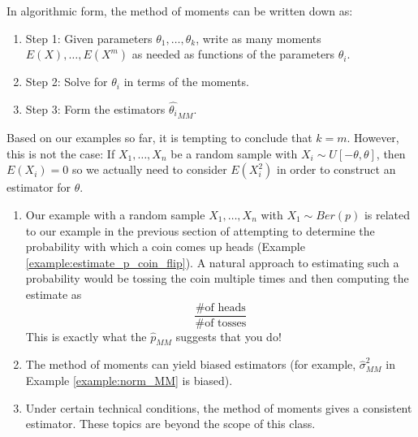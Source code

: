 In algorithmic form, the method of moments can be written down as:

\begin{enumerate}
\item Step 1: Given parameters $\theta_1, \ldots, \theta_k$, write as many moments $E(X), \ldots, E(X^m)$ as needed as functions of the parameters $\theta_i$.

\iffalse	\begin{center}
	\begin{tabular}{ c c c }
	 $E(X)$ & = & $h_1(\theta_1, \ldots, \theta_k)$\\ 
	 $E(X^2)$ & =& $h_2(\theta_1, \ldots, \theta_k)$\\  
	 $\vdots$ & & \\
	 $E(X^k)$ & = & $h_k(\theta_1, \ldots, \theta_k)$
	\end{tabular}
	\end{center} \fi

\item Step 2: Solve for $\theta_i$ in terms of the moments. \iffalse
	\begin{center}
	\begin{tabular}{ c c c }
	 $\theta_1$ & = & $\ell_1(E(X_1), \ldots, E(X^k))$\\
	 $\vdots$ & & \\
	 $\theta_k$ & = & $\ell_k(E(X), \ldots, E(X^k))$
	\end{tabular}
	\end{center} \fi

\item Step 3: Form the estimators $\hat{{\theta_i}}_{MM}$. \iffalse
	\[
		\hat{\theta_i}_{MM} = \ell_i\left(
			\frac{1}{n} \sum_{j=1}^n X_j,
			\frac{1}{n} \sum_{j=1}^n X_j^2,
			\ldots,
			\frac{1}{n} \sum_{j=1}^n X_j^k
		\right)
	\] \fi
\end{enumerate}

Based on our examples so far, it is tempting to conclude that $k=m$. However, this is not the case: If $X_1, \ldots, X_n$ be a random sample with $X_i \sim U[-\theta, \theta]$, then $E(X_i)=0$ so we actually need to consider $E(X_i^2)$ in order to construct an estimator for $\theta$.

\note
\begin{enumerate}
	\item Our example with a random sample $X_1, \ldots, X_n$ with $X_1 \sim Ber(p)$ is related to our example in the previous section of attempting to determine the probability with which a coin comes up heads (Example \ref{example:estimate_p_coin_flip}). A natural approach to estimating such a probability would be tossing the coin multiple times and then computing the estimate as
		\[
			\frac{
				\text{\# of heads}
			}{
				\text{\# of tosses}
			}
		\]
		This is exactly what the $\hat{p}_{MM}$ suggests that you do!
	\item The method of moments can yield biased estimators (for example, $\hat{\sigma}^2_{MM}$ in Example \ref{example:norm_MM} is biased).
	\item Under certain technical conditions, the method of moments gives a consistent estimator. These topics are beyond the scope of this class.
\end{enumerate}

